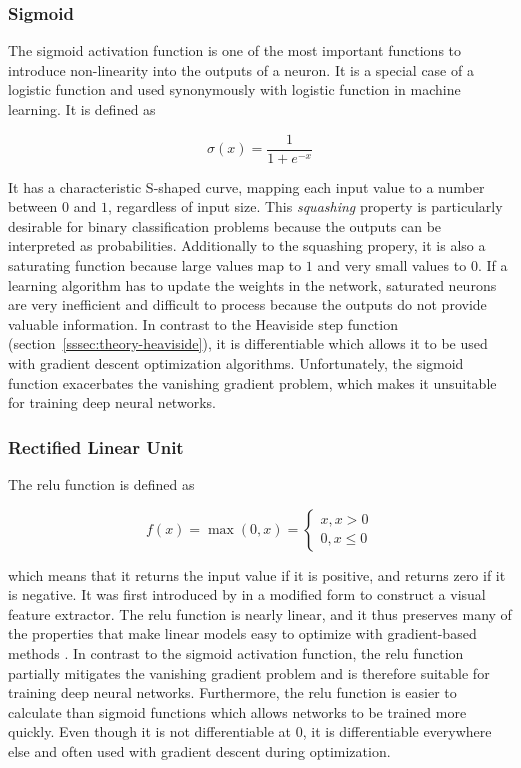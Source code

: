 \documentclass[final]{vutinfth} %
\begin{document}
\subsubsection{Sigmoid}
\label{sssec:theory-sigmoid}

The sigmoid activation function is one of the most important functions
to introduce non-linearity into the outputs of a neuron. It is a
special case of a logistic function and used synonymously with
logistic function in machine learning. It is defined as

\begin{equation}
  \label{eq:sigmoid}
  \sigma(x) = \frac{1}{1 + e^{-x}}
\end{equation}

It has a characteristic S-shaped curve, mapping each input value to a
number between $0$ and $1$, regardless of input size. This
\emph{squashing} property is particularly desirable for binary
classification problems because the outputs can be interpreted as
probabilities. Additionally to the squashing propery, it is also a
saturating function because large values map to $1$ and very small
values to $0$. If a learning algorithm has to update the weights in
the network, saturated neurons are very inefficient and difficult to
process because the outputs do not provide valuable information. In
contrast to the Heaviside step function
(section~\ref{sssec:theory-heaviside}), it is differentiable which
allows it to be used with gradient descent optimization
algorithms. Unfortunately, the sigmoid function exacerbates the
vanishing gradient problem, which makes it unsuitable for training
deep neural networks.

\subsubsection{Rectified Linear Unit}
\label{sssec:theory-relu}

The \gls{relu} function is defined as

\begin{equation}
  \label{eq:relu}
  f(x) = \max(0, x) =
  \begin{cases}
    x, x > 0 \\
    0, x \leq 0
  \end{cases}
\end{equation}

which means that it returns the input value if it is positive, and
returns zero if it is negative. It was first introduced by
\textcite{fukushima1969} in a modified form to construct a visual
feature extractor. The \gls{relu} function is nearly linear, and it
thus preserves many of the properties that make linear models easy to
optimize with gradient-based methods \cite{goodfellow2016}. In
contrast to the sigmoid activation function, the \gls{relu} function
partially mitigates the vanishing gradient problem and is therefore
suitable for training deep neural networks. Furthermore, the
\gls{relu} function is easier to calculate than sigmoid functions
which allows networks to be trained more quickly. Even though it is
not differentiable at $0$, it is differentiable everywhere else and
often used with gradient descent during optimization.
\end{document}
